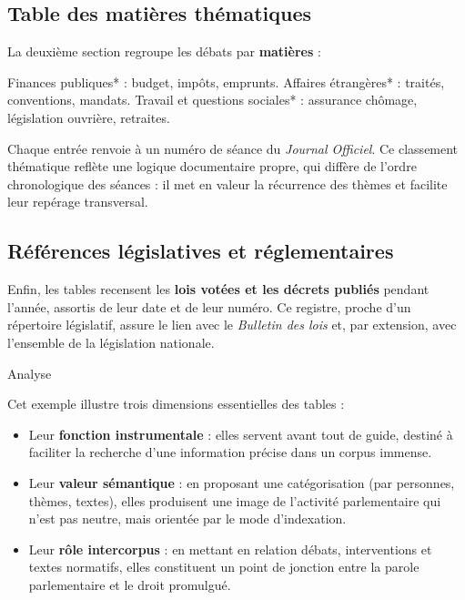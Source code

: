 \subsection{Table des matières thématiques}

La deuxième section regroupe les débats par \textbf{matières} :

\emph{ }Finances publiques* : budget, impôts, emprunts.
\emph{ }Affaires étrangères* : traités, conventions, mandats.
\emph{ }Travail et questions sociales* : assurance chômage, législation ouvrière, retraites.

Chaque entrée renvoie à un numéro de séance du \emph{Journal Officiel}. Ce classement thématique reflète une logique documentaire propre, qui diffère de l’ordre chronologique des séances : il met en valeur la récurrence des thèmes et facilite leur repérage transversal.

\subsection{Références législatives et réglementaires}

Enfin, les tables recensent les \textbf{lois votées et les décrets publiés} pendant l’année, assortis de leur date et de leur numéro. Ce registre, proche d’un répertoire législatif, assure le lien avec le \emph{Bulletin des lois} et, par extension, avec l’ensemble de la législation nationale.

 Analyse

Cet exemple illustre trois dimensions essentielles des tables :

\begin{itemize}
\item Leur \textbf{fonction instrumentale} : elles servent avant tout de guide, destiné à faciliter la recherche d’une information précise dans un corpus immense.
\item Leur \textbf{valeur sémantique} : en proposant une catégorisation (par personnes, thèmes, textes), elles produisent une image de l’activité parlementaire qui n’est pas neutre, mais orientée par le mode d’indexation.
\item Leur \textbf{rôle intercorpus} : en mettant en relation débats, interventions et textes normatifs, elles constituent un point de jonction entre la parole parlementaire et le droit promulgué.
\end{itemize}

